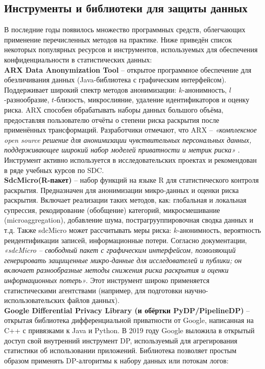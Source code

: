 \subsection{Инструменты и библиотеки для защиты данных}
В последние годы появилось множество программных средств, облегчающих применение перечисленных методов на практике. Ниже
приведён список некоторых популярных ресурсов и инструментов, используемых для обеспечения конфиденциальности в
статистических данных:\\
\textbf{ARX Data Anonymization Tool} – открытое программное обеспечение для обезличивания данных
(Java-библиотека с графическим интерфейсом). Поддерживает широкий спектр методов анонимизации: $k$-анонимность,
$l$-разнообразие, $t$-близость, микрослияние, удаление идентификаторов и оценку риска. ARX способен обрабатывать наборы
данных большого объёма, предоставляя пользователю отчёты о степени риска раскрытия после применённых трансформаций.
Разработчики отмечают, что ARX – \textit{«комплексное open source решение для анонимизации чувствительных персональных
данных, поддерживающее широкий набор моделей приватности и метрик риска»} \autocite{arx-deidentifier-org}. Инструмент
активно используется в исследовательских проектах и рекомендован в ряде учебных курсов по SDC.\\
\textbf{SdcMicro(R-пакет)} – набор функций на языке R для статистического контроля раскрытия. Предназначен для анонимизации микро-данных
и оценки риска раскрытия. Включает реализации таких методов, как: глобальная и локальная супрессия, рекодирование
(обобщение) категорий, микросмешивание (microaggregation), добавление шума, пострагрууппировочная сводка данных и т.д.
Также sdcMicro может рассчитывать меры риска: $k$-анонимность, вероятность реидентификации записей, информационные
потери. Согласно документации, \textit{«sdcMicro – свободный пакет с графическим интерфейсом, позволяющий генерировать
защищенные микро-данные для исследователей и публики; он включает разнообразные методы снижения риска раскрытия и оценки
информационных потерь»}. Этот инструмент широко применяется статистическими агентствами (например, для подготовки
научно-использовательских файлов данных).\\
\textbf{Google Differential Privacy Library (и обёртки PyDP/PipelineDP)} –
открытая библиотека дифференциальной приватности от Google, написанная на C++ с привязками к Java и Python. В 2019 году
Google выложила в открытый доступ свой внутренний инструмент DP, используемый для агрегирования статистики об
использовании приложений. Библиотека позволяет простым образом применять DP-алгоритмы к набору данных или потокам логов:
